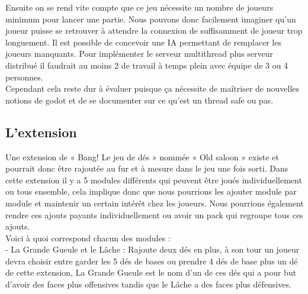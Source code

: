 \documentclass[a4paper,11pt]{article}
\begin{document}
Ensuite on se rend vite compte que ce jeu nécessite un nombre de joueurs minimum pour lancer une partie. Nous pouvons donc facilement imaginer qu’un joueur puisse se retrouver à attendre la connexion de suffisamment de joueur trop longuement. Il est possible de concevoir une IA permettant de remplacer les joueurs manquants.
Pour implémenter le serveur multithread plus serveur distribué il faudrait au moins 2
de travail à temps plein avec équipe de 3 ou 4 personnes. \\

Cependant cela reste dur à évaluer puisque ça nécessite de maîtriser de nouvelles notions de godot et de se documenter sur ce qu’est un thread safe ou pas.  \\


\subsection{L’extension}


Une extension de « Bang! Le jeu de dés » nommée « Old saloon » existe et pourrait donc être rajoutée au fur et à mesure dans le jeu une fois sorti. Dans cette extension il y a 5 modules différents qui peuvent être joués individuellement ou tous ensemble, cela implique donc que nous pourrions les ajouter module par module et maintenir un certain intérêt chez les joueurs. Nous pourrions également rendre ces ajouts payants individuellement ou avoir un pack qui regroupe tous ces ajouts. \\

	Voici à quoi correspond chacun des modules : \\
- La Grande Gueule et le Lâche : Rajoute deux dés en plus, à son tour un joueur devra choisir entre garder les 5 dés de bases ou prendre 4 dés de base plus un dé de cette extension, La Grande Gueule est le nom d’un de ces dés qui a pour but d’avoir des faces plus offensives tandis que le Lâche a des faces plus défensives. \\

\newpage
\end{document}
